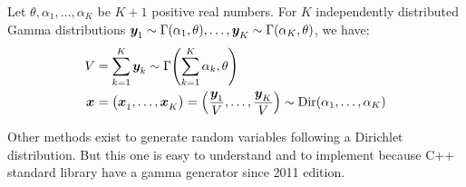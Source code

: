 \begin{prop}\label{prop:dirichlet:generation-from-gamma}
Let $\theta,\alpha_1,\ldots,\alpha_K$ be $K+1$ positive real numbers.
For $K$ independently distributed Gamma distributions
$\va y_1\sim\Gamma\bracket{\alpha_1,\theta},\ldots,\va y_K\sim\Gamma\bracket{\alpha_K,\theta}$,
we have:
\begin{subequations}
  \begin{align}
    V &= \sum_{k=1}^K \va y_k \sim \Gamma\bracket{\sum_{k=1}^K \alpha_k,\theta}
    \\
    \va x &= \bracket{\va x_1,\ldots,\va x_K} = \bracket{\frac{\va y_1}{V},\ldots,\frac{\va y_K}{V}} \sim \Dir\bracket{\alpha_1,\ldots,\alpha_K}
  \end{align}
\end{subequations}
\end{prop}

Other methods exist to generate random variables following a Dirichlet distribution.
But this one is easy to understand and to implement because C++ standard library have a gamma generator since 2011 edition.


